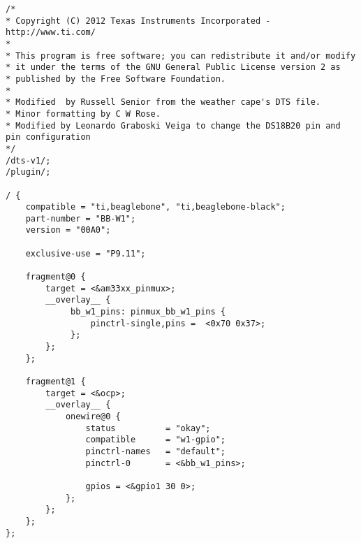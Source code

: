 \lstset{language=bash}
\begin{lstlisting}[frame=single, basicstyle=\linespread{0.85}\ttfamily\tiny, caption=w1.dts, label=dt_ds18b20]
/*
* Copyright (C) 2012 Texas Instruments Incorporated - http://www.ti.com/
*
* This program is free software; you can redistribute it and/or modify
* it under the terms of the GNU General Public License version 2 as
* published by the Free Software Foundation.
* 
* Modified  by Russell Senior from the weather cape's DTS file.
* Minor formatting by C W Rose.
* Modified by Leonardo Graboski Veiga to change the DS18B20 pin and pin configuration
*/
/dts-v1/;
/plugin/;

/ {
    compatible = "ti,beaglebone", "ti,beaglebone-black";
    part-number = "BB-W1";
    version = "00A0";

    exclusive-use = "P9.11";

    fragment@0 {
        target = <&am33xx_pinmux>;
        __overlay__ {
             bb_w1_pins: pinmux_bb_w1_pins {
                 pinctrl-single,pins =  <0x70 0x37>;
             };
        };
    };

    fragment@1 {
        target = <&ocp>;
        __overlay__ {
            onewire@0 {
                status          = "okay";
                compatible      = "w1-gpio";
                pinctrl-names   = "default";
                pinctrl-0       = <&bb_w1_pins>;

                gpios = <&gpio1 30 0>;
            };
        };
    };
};
\end{lstlisting}
